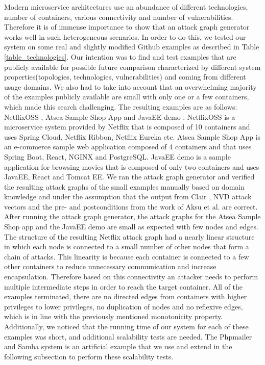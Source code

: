 Modern microservice architectures use an abundance of different technologies,  number of containers, various connectivity and number of vulnerabilities. Therefore it is of immense importance to show that an attack graph generator works well in such heterogeneous scenarios. In order to do this, we tested our system on some real and slightly modified Github examples as described in Table \ref{table_technologies}. Our intention was to find and test examples that are publicly available for possible future comparison characterized by different system properties(topologies, technologies, vulnerabilities) and coming from different usage domains. We also had to take into account that an overwhelming majority of the examples publicly available are small with only one or a few containers, which made this search challenging. The resulting examples are as follows: NetflixOSS \cite{netflixoss}, Atsea Sample Shop App \cite{atsea} and JavaEE demo \cite{java}. NetflixOSS is a microservice system provided by Netflix that is composed of 10 containers and uses Spring Cloud, Netflix Ribbon, Netflix Eureka etc. Atsea Sample Shop App is an e-commerce sample web application composed of 4 containers and that uses Spring Boot, React, NGINX and PostgreSQL. JavaEE demo is a sample application for browsing movies that is composed of only two containers and uses JavaEE, React and Tomcat EE. We ran the attack graph generator and verified the resulting attack graphs of the small examples manually based on domain knowledge and under the assumption that the output from Clair \cite{clair}, NVD attack vectors \cite{booth2013national} and the pre- and postconditions from the work of Aksu et al. \cite{aksu2018automated} are correct. After running the attack graph generator, the attack graphs for the Atsea Sample Shop app and the JavaEE demo are small as expected with few nodes and edges. The structure of the resulting Netflix attack graph had a nearly linear structure in which each node is connected to a small number of other nodes that form a chain of attacks. This linearity is because each container is connected to a few other containers to reduce unnecessary communication and increase encapsulation. Therefore based on this connectivity an attacker needs to perform multiple intermediate steps in order to reach the target container. All of the examples terminated, there are no directed edges from containers with higher privileges to lower privileges, no duplication of nodes and no reflexive edges, which is in line with the previously mentioned monotonicity property. Additionally, we noticed that the running time of our system for each of these examples was short, and additional scalability tests are needed. The Phpmailer \cite{phpmailer} and Samba \cite{samba} system is an artificial example that we use and extend in the following subsection to perform these scalability tests.

